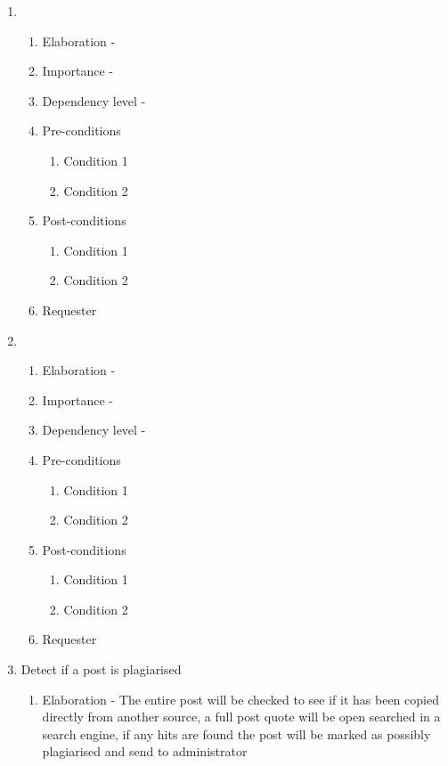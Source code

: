 \documentclass[12pt]{article}
\begin{document}
\begin{enumerate}
   \item  %
  \begin{enumerate}
    \item Elaboration - 
    \item Importance - 
    \item Dependency level - 
    \item Pre-conditions
    \begin{enumerate}
    	\item Condition 1
    	\item Condition 2
    \end{enumerate}
        \item Post-conditions
    \begin{enumerate}
    	\item Condition 1
    	\item Condition 2
    \end{enumerate}
    \item Requester
  \end{enumerate}
\newpage %
   \item  %
  \begin{enumerate}
    \item Elaboration - 
    \item Importance - 
    \item Dependency level - 
    \item Pre-conditions
    \begin{enumerate}
    	\item Condition 1
    	\item Condition 2
    \end{enumerate}
        \item Post-conditions
    \begin{enumerate}
    	\item Condition 1
    	\item Condition 2
    \end{enumerate}
    \item Requester
  \end{enumerate}
\newpage %
   \item Detect if a post is plagiarised  %
  \begin{enumerate}
    \item Elaboration - The entire post will be checked to see if it has been copied directly from another source, a full post quote will be open searched in a search engine, if any hits are found the post will be marked as possibly plagiarised and send to administrator

\end{enumerate}
\end{enumerate}
\end{document}
